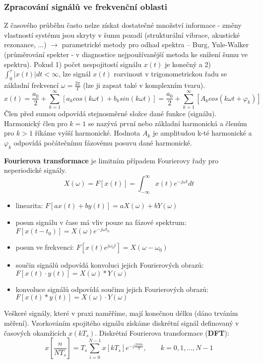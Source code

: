 \subsubsection*{Zpracování signálů ve frekvenční oblasti}
Z časového průběhu často nelze získat dostatečné množství informace - změny vlastností systému jsou skryty v šumu pozadí (strukturální vibrace, akustické
rezonance, ...) $ \to $ parametrické metody pro odhad spektra – Burg, Yule-Walker (průměrování spekter - v diagnostice nejpoužívanější metoda ke snížení šumu ve spektru).
Pokud 1) počet nespojitostí signálu $ x(t) $ je konečný a 2) $ \displaystyle{\int_{0}^\tau}|x(t)| dt < \infty $, lze signál $ x(t) $ rozvinout v trigonometrickou řadu se základní frekvencí $ \omega = \frac{2\pi}{T} $ (lze ji zapsat také v komplexním tvaru).
\begin{equation}
x(t) = \frac{a_0}{2} + \displaystyle{\sum_{k=1}^\infty \left[ a_k cos(k\omega t) + b_k sin(k\omega t) \right]} = \frac{a_0}{2} + \displaystyle{\sum_{k=1}^\infty \left[ A_k cos(k\omega t + \varphi_k) \right]}
\end{equation}
Člen před sumou odpovídá stejnosměrné složce dané funkce (signálu). Harmonický člen pro $ k = 1 $ se nazývá první nebo základní harmonická a členům pro $ k > 1 $ říkáme vyšší harmonické. Hodnota $ A_k $ je amplitudou k-té harmonické a $ \varphi_k $ odpovídá počátečnímu fázovému posuvu dané harmonické.

\textbf{Fourierova transformace} je limitním případem Fourierovy řady pro neperiodické signály.
\begin{equation}
\boxed{X(\omega) = F[x(t)] = \displaystyle{\int_{-\infty}^\infty} x(t) e^{-j\omega t} dt}
\end{equation}
\begin{itemize}
\item linearita: $ F[ax(t) + by(t)] = aX(\omega) + bY(\omega) $
\item posun signálu v čase má vliv pouze na fázové spektrum: $ F[x(t-t_0)] = X(\omega)e^{-j\omega t_0} $
\item posun ve frekvenci: $ F[x(t)e^{j \omega_0 t}] = X(\omega-\omega_0) $
\item součin signálů odpovídá konvoluci jejich Fourierových obrazů: $ F[x(t) \cdot y(t)] = X(\omega) * Y(\omega) $
\item konvoluce signálů odpovídá součinu jejich Fourierových obrazů: $ F[x(t) * y(t)] = X(\omega) \cdot Y(\omega) $
\end{itemize}
Veškeré signály, které v praxi naměříme, mají konečnou délku (dáno trváním měření). Vzorkováním spojitého signálu získáme diskrétní signál definovaný v časových okamžicích $ x(kT_s) $. Diskrétní Fourierova transformace (\textbf{DFT}):
\begin{equation}
x \left[ \frac{n}{NT_s} \right] = T_s \displaystyle{\sum_{i=0}^{N-1}}x [kT_s]e^{-j\frac{2\pi k n}{N}}, \qquad k=0,1,...,N-1 
\end{equation}

